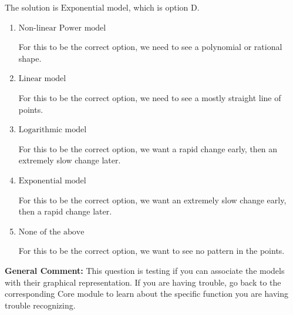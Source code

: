 \documentclass{extbook}[14pt]
\begin{document}
\begin{enumerate}
{The solution is \( \text{Exponential model} \), which is option D.\begin{enumerate}[label=\Alph*.]
\item \( \text{Non-linear Power model} \)

For this to be the correct option, we need to see a polynomial or rational shape.
\item \( \text{Linear model} \)

For this to be the correct option, we need to see a mostly straight line of points.
\item \( \text{Logarithmic model} \)

For this to be the correct option, we want a rapid change early, then an extremely slow change later.
\item \( \text{Exponential model} \)

For this to be the correct option, we want an extremely slow change early, then a rapid change later.
\item \( \text{None of the above} \)

For this to be the correct option, we want to see no pattern in the points.
\end{enumerate}

\textbf{General Comment:} This question is testing if you can associate the models with their graphical representation. If you are having trouble, go back to the corresponding Core module to learn about the specific function you are having trouble recognizing.
}
\end{enumerate}
\end{document}
